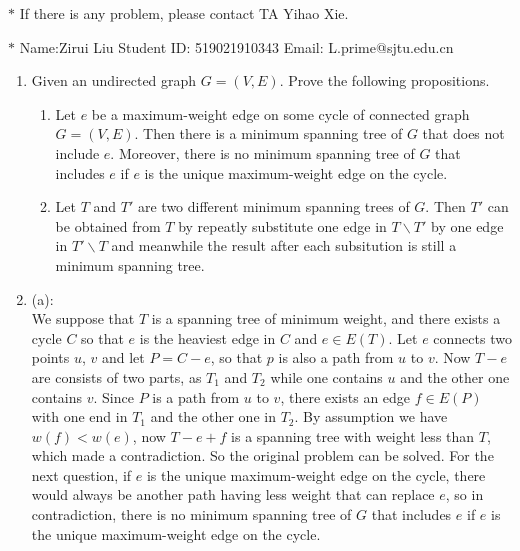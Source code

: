 \documentclass[12pt,a4paper]{article}
\makeatletter
\newtheorem*{solution}{Solution}
\theoremstyle{definition}
\renewenvironment{solution}[1][Solution] {\par\pushQED{\qed}\normalfont\topsep6\p@\@plus6\p@\relax\trivlist\item[\hskip\labelsep\bfseries#1\@addpunct{.}]\ignorespaces}{\popQED\endtrivlist\@endpefalse} \makeatother
\makeatother
\begin{document}
\noindent

\noindent{}
\begin{center}
\footnotesize{\color{red}$*$ If there is any problem, please contact TA Yihao Xie. }

\footnotesize{\color{blue}$*$ Name:Zirui Liu  \quad Student ID: 519021910343 \quad Email: L.prime@sjtu.edu.cn}
\end{center}

\begin{enumerate}

	\item Given an undirected graph $G = (V, E)$. Prove the following propositions.
	
	\begin{enumerate}
		\item Let $e$ be a maximum-weight edge on some cycle of connected graph $G=(V,E)$.
        Then there is a minimum spanning tree of $G$ that does not include $e$. Moreover, there is no minimum spanning tree of $G$ that includes $e$ if $e$ is the unique maximum-weight edge on the cycle. 
		\item Let $T$ and $T'$ are two different minimum spanning trees of $G$. Then $T'$ can be obtained from $T$ by repeatly substitute one edge in $T\backslash T'$ by one edge in $T'\backslash T$ and meanwhile the result after each subsitution is still a minimum spanning tree.
	\end{enumerate}
	
	\begin{solution}
	
	(a):\\
	We suppose that $T$ is a spanning tree of minimum weight, and
    there exists a cycle $C$ so that $e$ is the heaviest edge in $C$ and $e \in E\left(T\right)$. Let $e$ connects two points $u$, $v$
    and let $P = C − e$, so that $p$ is also a path from $u$ to $v$. Now $T − e$ are consists of two parts, as $T_1$ and $T_2$
    while one contains $u$ and the other one contains $v$. Since $P$ is a path from $u$ to $v$, there exists an edge $f \in E\left(P\right) $ with one end in $T_1$ and the other one in $T_2$. By assumption we have
    $w\left(f\right) < w\left(e\right)$, now $T − e + f$ is a spanning tree with weight less than $T$, which made a contradiction. So the original problem can be solved. For the next question, if $e$ is the unique maximum-weight edge on the cycle, there would always be another path having less weight that can replace $e$, so in contradiction, there is no minimum spanning tree of $G$ that includes $e$ if $e$ is the unique maximum-weight edge on the cycle.
	

\end{solution}
\end{enumerate}
\end{document}
